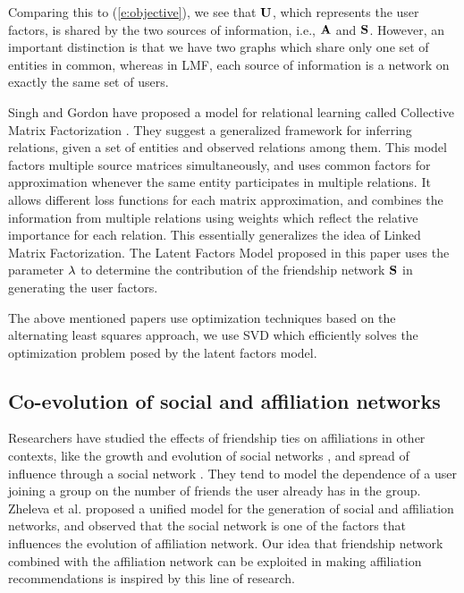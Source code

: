 Comparing this to (\ref{e:objective}), we see that $\mathbf{U}$, which represents the user factors, is shared by the two sources of information, i.e., $\mathbf{A}$ and $\mathbf{S}$. However, an important distinction is that we have two graphs which share only one set of entities in common, whereas in LMF, each source of information is a network on exactly the same set of users.

Singh and Gordon have proposed a model for relational learning called Collective Matrix Factorization \cite{SinghCMF}. They suggest a generalized framework for inferring relations, given a set of entities and observed relations among them. This model factors multiple source matrices simultaneously, and uses common factors for approximation whenever the same entity participates in multiple relations. It allows different loss functions for each matrix approximation, and combines the information from multiple relations using weights which reflect the relative importance for each relation. This essentially generalizes the idea of Linked Matrix Factorization. The Latent Factors Model proposed in this paper uses the parameter $\lambda$ to determine the contribution of the friendship network $\mathbf{S}$ in generating the user factors.

The above mentioned papers use optimization techniques based on the alternating least squares approach, we use SVD which efficiently solves the optimization problem posed by the latent factors model.

\subsection{Co-evolution of social and affiliation networks}
Researchers have studied the effects of friendship ties on affiliations in other contexts, like the growth and evolution of social networks \cite{GroupFormation}, and spread of influence through a social network 
\cite{KleinbergInfluence,ChenInfMax}. They tend to model the dependence of a user joining a group on the number of friends the user already has in the group. Zheleva et al. \cite{Coevolution} proposed a unified model for the generation of social and affiliation networks, and observed that the social network is one of the factors that influences the evolution of affiliation network. Our idea that friendship network combined with the affiliation network can be exploited in making affiliation recommendations is inspired by this line of research.
